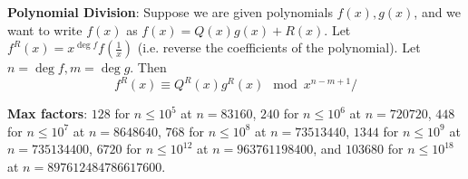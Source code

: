 \textbf{Polynomial Division}: Suppose we are given polynomials $f(x), g(x)$, and we want to write $f(x)$ as $f(x) = Q(x)g(x) + R(x)$. Let $f^R(x) = x^{\deg f}f(\frac{1}{x})$ (i.e. reverse the coefficients of the polynomial). Let $n = \deg f, m = \deg g$. Then
\begin{equation*}
  f^R(x) \equiv Q^R(x) g^R(x) \mod x^{n-m+1}/
\end{equation*}

\textbf{Max factors}: $128$ for $n \le 10^5$ at $n = 83160$, $240$ for $n \le 10^6$ at $n = 720720$, $448$ for $n \le 10^7$ at $n = 8648640$, $768$ for $n \le 10^8$ at $n = 73513440$, $1344$ for $n \le 10^9$ at $n = 735134400$, $6720$ for $n \le 10^{12}$ at $n = 963761198400$, and $103680$ for $n \le 10^{18}$ at $n = 897612484786617600$. 
